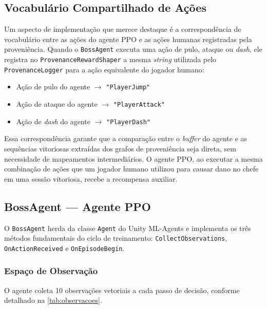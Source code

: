 \subsection{Vocabulário Compartilhado de Ações}
\label{subsec:vocabulario-acoes}

Um aspecto de implementação que merece destaque é a correspondência de
vocabulário entre as ações do agente PPO e as ações humanas registradas pela
proveniência. Quando o \texttt{BossAgent} executa uma ação de pulo, ataque ou
\textit{dash}, ele registra no \texttt{ProvenanceRewardShaper} a mesma
\textit{string} utilizada pelo \texttt{ProvenanceLogger} para a ação
equivalente do jogador humano:

\begin{itemize}
    \item Ação de pulo do agente $\rightarrow$ \texttt{"PlayerJump"}
    \item Ação de ataque do agente $\rightarrow$ \texttt{"PlayerAttack"}
    \item Ação de \textit{dash} do agente $\rightarrow$ \texttt{"PlayerDash"}
\end{itemize}

Essa correspondência garante que a comparação entre o \textit{buffer} do
agente e as sequências vitoriosas extraídas dos grafos de proveniência seja
direta, sem necessidade de mapeamentos intermediários. O agente PPO, ao
executar a mesma combinação de ações que um jogador humano utilizou para
causar dano no chefe em uma sessão vitoriosa, recebe a recompensa auxiliar.

\subsection{BossAgent --- Agente PPO}
\label{subsec:boss-agent-impl}

O \texttt{BossAgent} herda da classe \texttt{Agent} do Unity ML-Agents
\cite{juliani2020unity} e implementa os três métodos fundamentais do ciclo de
treinamento: \texttt{CollectObservations}, \texttt{OnActionReceived} e
\texttt{OnEpisodeBegin}.

\subsubsection{Espaço de Observação}

O agente coleta 10 observações vetoriais a cada passo de decisão, conforme
detalhado na \autoref{tab:observacoes}.

